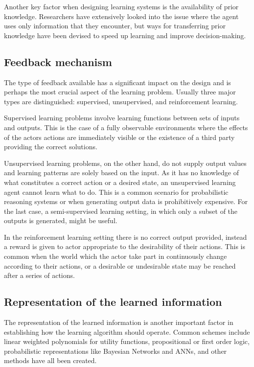 Another key factor when designing learning systems is the availability of prior knowledge. Researchers have extensively looked into the issue where the agent uses only information that they encounter, but ways for transferring prior knowledge have been devised to speed up learning and improve decision-making.\cite{Transfer_Learning}

\subsection*{Feedback mechanism}
The type of feedback available has a significant impact on the design and is perhaps the most crucial aspect of the learning problem. Usually three major types are distinguished: supervised, unsupervised, and reinforcement learning.

Supervised learning problems involve learning functions between sets of inputs and outputs. This is the case of a fully observable environments where the effects of the actors actions are immediately visible or the existence of a third party providing the correct solutions.

Unsupervised learning problems, on the other hand, do not supply output values and learning patterns are solely based on the input. As it has no knowledge of what constitutes a correct action or a desired state, an unsupervised learning agent cannot learn what to do. This is a common scenario for probabilistic reasoning systems or when generating output data is prohibitively expensive. For the last case, a semi-supervised learning setting, in which only a subset of the outputs is generated, might be useful.

In the reinforcement learning setting there is no correct output provided, instead a reward is given to actor appropriate to the desirability of their actions. This is common when the world which the actor take part in continuously change according to their actions, or a desirable or undesirable state may be reached after a series of actions.

\subsection*{Representation of the learned information}
The representation of the learned information is another important factor in establishing how the learning algorithm should operate. Common schemes include linear weighted polynomials for utility functions, propositional or first order logic, probabilistic representations like Bayesian Networks\cite{Probabilistic_Reasoning} and ANNs\cite{McCulloch1943}, and other methods have all been created.

